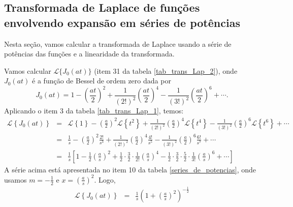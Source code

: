 \subsection{Transformada de Laplace de funções envolvendo expansão em séries de potências}
Nesta seção, vamos calcular a transformada de Laplace usando a série de potências das funções e a linearidade da transformada.
\begin{ex}Vamos calcular $\mathcal{L}\{J_0(at)\}$ (item 31 da tabela \ref{tab_trans_Lap_2}), onde $J_0(at)$ é a função de Bessel de ordem zero dada por
\begin{equation}
J_0(at)=1-\left(\frac{at}{2}\right)^2+\frac{1}{(2!)^2}\left(\frac{at}{2}\right)^4-\frac{1}{(3!)^2}\left(\frac{at}{2}\right)^6+\cdots.
\end{equation}
Aplicando o item 3 da tabela \ref{tab_trans_Lap_1}, temos:
\begin{eqnarray*}
\mathcal{L}\left\{J_0(at)\right\}&=&\mathcal{L}\left\{1\right\}-\left(\frac{a}{2}\right)^2\mathcal{L}\left\{t^2\right\}+\frac{1}{(2!)^2}\left(\frac{a}{2}\right)^4\mathcal{L}\left\{t^4\right\}-\frac{1}{(3!)^2}\left(\frac{a}{2}\right)^6\mathcal{L}\left\{t^6\right\}+\cdots\\
&=&\frac{1}{s}-\left(\frac{a}{2}\right)^2\frac{2!}{s^3}+\frac{1}{(2!)^2}\left(\frac{a}{2}\right)^4\frac{4!}{s^5}-\frac{1}{(3!)^2}\left(\frac{a}{2}\right)^6\frac{6!}{s^7}+\cdots\\
&=&\frac{1}{s}\left[1-\frac{1}{2}\left(\frac{a}{s}\right)^2+\frac{1}{2}\cdot \frac{3}{2}\cdot \frac{1}{2!}\left(\frac{a}{s}\right)^4-\frac{1}{2}\cdot\frac{3}{2}\cdot \frac{5}{2}\cdot\frac{1}{3!} \left(\frac{a}{s}\right)^6+\cdots\right]
\end{eqnarray*}
A série acima está apresentada no item 10 da tabela \ref{series_de_potencias}, onde usamos $m=-\frac{1}{2}$ e $x=\left(\frac{a}{s}\right)^2$. Logo,
\begin{eqnarray*}
\mathcal{L}\left\{J_0(at)\right\}&=&\frac{1}{s}\left(1+\left(\frac{a}{s}\right)^2\right)^{-\frac{1}{2}}
\end{eqnarray*}
\end{ex}
